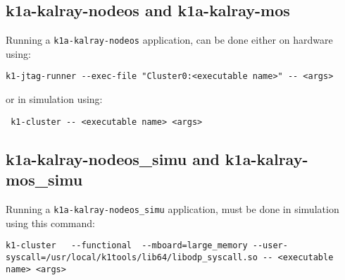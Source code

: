 \documentclass{trkalray}
\begin{document}
\subsection{k1a-kalray-nodeos and k1a-kalray-mos}
Running a \texttt{k1a-kalray-nodeos} application, can be done either
on hardware using:
\begin{lstlisting}
k1-jtag-runner --exec-file "Cluster0:<executable name>" -- <args>
\end{lstlisting}
or in simulation using:
\begin{lstlisting}
 k1-cluster -- <executable name> <args>
\end{lstlisting}

\subsection{k1a-kalray-nodeos\_simu and k1a-kalray-mos\_simu}
Running a \texttt{k1a-kalray-nodeos\_simu} application, must be done in
simulation using this command:
\begin{lstlisting}
k1-cluster   --functional  --mboard=large_memory --user-syscall=/usr/local/k1tools/lib64/libodp_syscall.so -- <executable name> <args>
\end{lstlisting}
\end{document}
